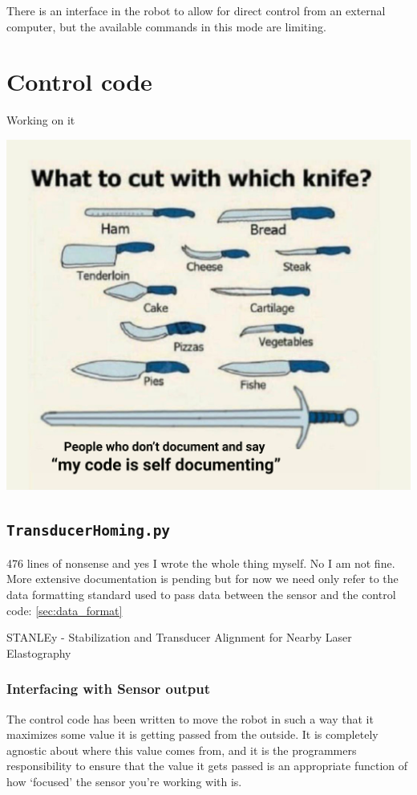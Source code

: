 \documentclass[11pt]{article}
\begin{document}
There is an interface in the robot to allow for direct control from an external computer, but the available commands in this mode are limiting.
\section{Control code}\label{sec:control_code}
Working on it
\begin{center}
    \includegraphics[width=.6\linewidth]{figures/control_code_loading_image.png}
\end{center}

\subsection{\texttt{TransducerHoming.py}}\label{sec:TransducerHoming}
476 lines of nonsense and yes I wrote the whole thing myself. No I am not fine. More extensive documentation is pending but for now we need only refer to the data formatting standard used to pass data between the sensor and the control code: \autoref{sec:data_format}

STANLEy -\> Stabilization and Transducer Alignment for Nearby Laser Elastography

\subsubsection{Interfacing with Sensor output}\label{sec:data_format}
The control code has been written to move the robot in such a way that it maximizes some value it is getting passed from the outside. It is completely agnostic about where this value comes from, and it is the programmers responsibility to ensure that the value it gets passed is an appropriate function of how `focused' the sensor you're working with is.
\end{document}
